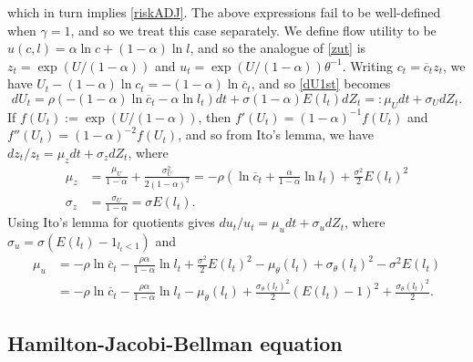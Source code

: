 \documentclass[11pt]{article}
\theoremstyle{plain}
\begin{document}
which in turn implies \eqref{riskADJ}. The above expressions fail to be well-defined when $\gamma=1$, and so we treat this case separately. We define flow utility to be $u(c,l) = \alpha \ln c + (1-\alpha) \ln l$, and so the analogue of \eqref{zut} is $z_t = \exp(U/(1-\alpha))$ and $u_t = \exp(U/(1-\alpha))\theta^{-1}$. Writing $c_t = \overline{c}_tz_t$, we have $U_t - (1 - \alpha) \ln c_t = - (1 - \alpha) \ln \overline{c}_t$, and so \eqref{dU1st} becomes 
$$
dU_t = \rho{\left(- (1 - \alpha) \ln \overline{c}_t - \alpha \ln l_t\right)}dt + \sigma (1-\alpha)E(l_t) dZ_t =: \mu_Udt + \sigma_UdZ_t.
$$ 
If $f(U_t) := \exp(U/(1-\alpha))$, then $f'(U_t) = (1-\alpha)^{-1}f(U_t)$ and $f''(U_t) = (1-\alpha)^{-2}f(U_t)$, and so from Ito's lemma, we have $dz_t/z_t = \mu_zdt + \sigma_zdZ_t$, where
\begin{equation}
\begin{aligned}
\mu_z & = \frac{\mu_U}{1-\alpha} + \frac{\sigma_U^2}{2(1-\alpha)^2} =-\rho{\left(\ln \overline{c}_t + \frac{\alpha}{1-\alpha} \ln l_t\right)} + \frac{\sigma^2}{2} E(l_t)^2
\\ \sigma_z & = \frac{\sigma_U}{1-\alpha} = \sigma E(l_t).
\end{aligned} %
\label{zlawLOG} 
\end{equation}
Using Ito's lemma for quotients gives $du_t/u_t = \mu_udt + \sigma_udZ_t$, where $\sigma_u = \sigma (E(l_t) - 1_{l_t<1})$ and
\begin{equation}
\begin{aligned} %
\mu_u & = -\rho \ln \overline{c}_t - \frac{\rho\alpha}{1-\alpha} \ln l_t + \frac{\sigma^2}{2} E(l_t)^2 - \mu_{\theta}(l_t) + \sigma_{\theta}(l_t)^2 - \sigma^2E(l_t) 
\\ & = -\rho \ln \overline{c}_t - \frac{\rho\alpha}{1-\alpha} \ln l_t - \mu_{\theta}(l_t) + \frac{\sigma_{\theta}(l_t)^2}{2}(E(l_t) - 1)^2 + \frac{\sigma_{\theta}(l_t)^2}{2}.
\end{aligned}
\label{normlawLOG}
\end{equation}


\subsection{Hamilton-Jacobi-Bellman equation} \label{HJB}
\end{document}
